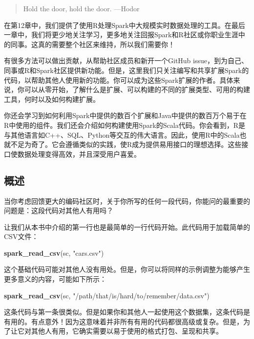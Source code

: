 \documentclass[
]{article}
\newenvironment{Shaded}{\begin{snugshade}}{\end{snugshade}}
\newcommand{\KeywordTok}[1]{\textcolor[rgb]{0.13,0.29,0.53}{\textbf{#1}}}
\newcommand{\NormalTok}[1]{#1}
\newcommand{\StringTok}[1]{\textcolor[rgb]{0.31,0.60,0.02}{#1}}
\begin{document}
\begin{quote}
Hold the door, hold the door. ---Hodor
\end{quote}

在第12章中，我们提供了使用R处理Spark中大规模实时数据处理的工具。在最后一章中，我们将更少地关注学习，更多地关注回报Spark和R社区或你职业生涯中的同事。这真的需要整个社区来维持，所以我们需要你！

有很多方法可以做出贡献，从帮助社区成员和新开一个GitHub
issue，到为自己、同事或R和Spark社区提供新功能。但是，这里我们只关注编写和共享扩展Spark的代码，以帮助其他人使用新的功能。你可以成为这些Spark扩展的作者。具体来说，你可以从零开始，了解什么是扩展、可以构建的不同的扩展类型、可用的构建工具，何时以及如何构建扩展。

你还会学习到如何利用Spark中提供的数百个扩展和Java中提供的数百万个易于在R中使用的组件。我们还会介绍如何构建使用Spark的Scala代码。你会看到，R是与其他语言如C++、SQL、Python等交互的伟大语言。因此，使用R中的Scala也就不足为奇了。它会遵循类似的实践，使R成为提供易用接口的理想选择。这些接口使数据处理变得高效，并且深受用户喜爱。

\hypertarget{ux6982ux8ff0-12}{%
\subsection{概述}\label{ux6982ux8ff0-12}}

当你考虑回馈更大的编码社区时，关于你所写的任何一段代码，你能问的最重要的问题是：这段代码对其他人有用吗？

让我们从本书中介绍的第一行也是最简单的一行代码开始。此代码用于加载简单的CSV文件：

\begin{Shaded}
\begin{Highlighting}[]
\KeywordTok{spark_read_csv}\NormalTok{(sc, }\StringTok{"cars.csv"}\NormalTok{)}
\end{Highlighting}
\end{Shaded}

这个基础代码可能对其他人没有用处。但是，你可以将同样的示例调整为能够产生更多意义的内容，可能如下所示：

\begin{Shaded}
\begin{Highlighting}[]
\KeywordTok{spark_read_csv}\NormalTok{(sc, }\StringTok{"/path/that/is/hard/to/remember/data.csv"}\NormalTok{)}
\end{Highlighting}
\end{Shaded}

这条代码与第一条很类似。但是如果你和其他人一起使用这个数据集，这条代码是有用的。有点意外！因为这意味着并非所有有用的代码都很高级或复杂。但是，为了让它对其他人有用，它确实需要以易于使用的格式打包、呈现和共享。
\end{document}
